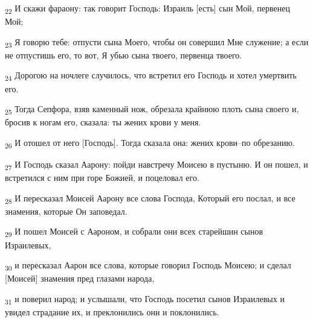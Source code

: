 \begin{tcolorbox}
\textsubscript{22} И скажи фараону: так говорит Господь: Израиль [есть] сын Мой, первенец Мой;
\end{tcolorbox}
\begin{tcolorbox}
\textsubscript{23} Я говорю тебе: отпусти сына Моего, чтобы он совершил Мне служение; а если не отпустишь его, то вот, Я убью сына твоего, первенца твоего.
\end{tcolorbox}
\begin{tcolorbox}
\textsubscript{24} Дорогою на ночлеге случилось, что встретил его Господь и хотел умертвить его.
\end{tcolorbox}
\begin{tcolorbox}
\textsubscript{25} Тогда Сепфора, взяв каменный нож, обрезала крайнюю плоть сына своего и, бросив к ногам его, сказала: ты жених крови у меня.
\end{tcolorbox}
\begin{tcolorbox}
\textsubscript{26} И отошел от него [Господь]. Тогда сказала она: жених крови--по обрезанию.
\end{tcolorbox}
\begin{tcolorbox}
\textsubscript{27} И Господь сказал Аарону: пойди навстречу Моисею в пустыню. И он пошел, и встретился с ним при горе Божией, и поцеловал его.
\end{tcolorbox}
\begin{tcolorbox}
\textsubscript{28} И пересказал Моисей Аарону все слова Господа, Который его послал, и все знамения, которые Он заповедал.
\end{tcolorbox}
\begin{tcolorbox}
\textsubscript{29} И пошел Моисей с Аароном, и собрали они всех старейшин сынов Израилевых,
\end{tcolorbox}
\begin{tcolorbox}
\textsubscript{30} и пересказал Аарон все слова, которые говорил Господь Моисею; и сделал [Моисей] знамения пред глазами народа,
\end{tcolorbox}
\begin{tcolorbox}
\textsubscript{31} и поверил народ; и услышали, что Господь посетил сынов Израилевых и увидел страдание их, и преклонились они и поклонились.
\end{tcolorbox}

